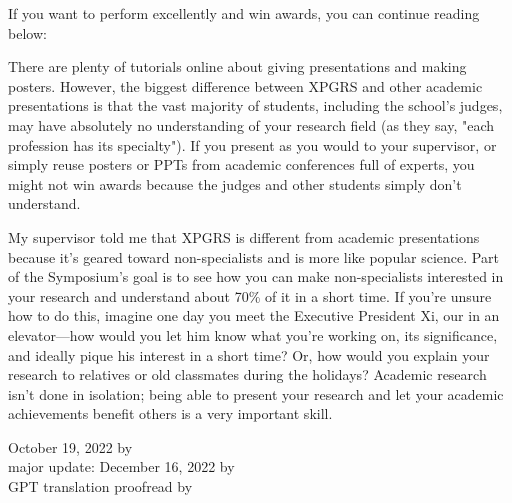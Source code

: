 If you want to perform excellently and win awards, you can continue reading below:

There are plenty of tutorials online about giving presentations and making posters. However, the biggest difference between XPGRS and other academic presentations is that the vast majority of students, including the school's judges, may have absolutely no understanding of your research field (as they say, "each profession has its specialty"). If you present as you would to your supervisor, or simply reuse posters or PPTs from academic conferences full of experts, you might not win awards because the judges and other students simply don't understand.

My supervisor told me that XPGRS is different from academic presentations because it's geared toward non-specialists and is more like popular science. Part of the Symposium's goal is to see how you can make non-specialists interested in your research and understand about 70\% of it in a short time. If you're unsure how to do this, imagine one day you meet the Executive President Xi, our  in an elevator—how would you let him know what you're working on, its significance, and ideally pique his interest in a short time? Or, how would you explain your research to relatives or old classmates during the holidays? Academic research isn't done in isolation; being able to present your research and let your academic achievements benefit others is a very important skill.

\begin{flushright}
    October 19, 2022 by \Wu \\
    major update: December 16, 2022 by \Wu \\
    GPT translation proofread by \Shiyao
\end{flushright}